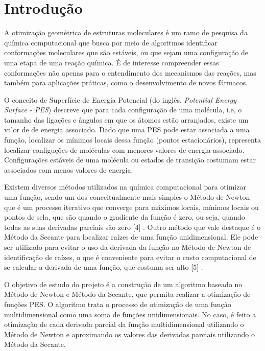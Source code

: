 \section{Introdução}

A otimização geométrica de estruturas moleculares é um ramo de pesquisa da química
computacional que busca por meio de algoritmos identificar conformações moleculares que
são estáveis, ou que sejam uma configuração de uma etapa de uma reação química. É de interesse compreender essas conformações não apenas para o entendimento dos mecanismos das reações, mas também para aplicações práticas, como o desenvolvimento de novos fármacos.

O conceito de Superfície de Energia Potencial (do inglês, \textit{Potential Energy Surface - PES}) descreve que para cada configuração de uma molécula, i.e, o tamanho das ligações e ângulos em que os átomos estão arranjados, existe um valor de de energia associado. Dado que uma PES pode estar associada a uma função, localizar os mínimos locais dessa função (pontos estacionários), representa localizar configuções de moléculas com menores valores de energia associado. Configurações estáveis de uma molécula ou estados de transição costumam estar associados com menos valores de energia. %





Existem diversos métodos utilizados na química computacional para otimizar uma
função, sendo um dos conceitualmente mais simples o Método de Newton que é um processo
iterativo que converge para máximos locais, mínimos locais ou pontos de sela, que são
quando o gradiente da função é zero, ou seja, quando todas as suas derivadas parciais são
zero [4] . Outro método que vale destaque é o Método da Secante para localizar raízes de uma
função unidimensional. Ele pode ser utilizado para evitar o uso da derivada da função no
Método de Newton de identificação de raízes, o que é conveniente para evitar o custo
computacional de se calcular a derivada de uma função, que costuma ser alto [5] .


O objetivo de estudo do projeto é a construção de um algoritmo baseado no Método de Newton e Método da Secante, que permita realizar a otimização de funções PES. O algoritmo trata o processo de otimização de uma função multidimensional como uma soma de funções unidimensionais. No caso, é feito a otimização de cada derivada parcial da função multidimensional utilizando o Método de Newton e aproximando os valores das derivadas parciais utilizando o Método da Secante.

